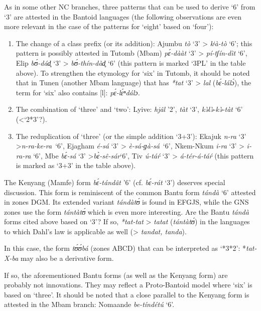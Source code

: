 \newpage    
As in some other NC branches, three patterns that can be used to derive `6' from `3' are attested in the Bantoid languages (the following observations are even more relevant in the case of the patterns for `eight' based on `four'):

\begin{enumerate}
\item The change of a class prefix (or its addition): Ajumbu \textit{tò} ‘3’ > \textit{kʲà-tò} ‘6’; this pattern is possibly attested in Tutomb (Mbam) \textit{p{\'{ɛ}}-dààt} ‘3’ > \textit{pí-tʃín-dìt} ‘6’, Elip \textit{b{\'{ʊ}}-dád̥} ‘3’ > \textit{b{\'{ʊ}}-thín-dàd̥} ‘6’ (this pattern is marked ‘3PL’ in the table above). To strengthen the etymology for `six' in Tutomb, it should be noted that in Tunen (another Mbam language) that has \textit{*tat} ‘3’ > \textit{lal} (\textit{b{\'{ɛ}}-lál{\'{ɔ}}}), the term for `six' also contains [l]: \textit{p{\'{ɛ}}-l{\'{ɛ}}ⁿdálɔ.}
  
\item The combination of `three' and `two': Lyive: \textit{hjâl} ’2’, \textit{tàt} ‘3’, \textit{k{\`{ə}}l{\`{ə}}-k{\`{ə}}-tàt} ‘6’ (<‘2*3’?).
\item The reduplication of `three' (or the simple addition ‘3+3’): Ekajuk \textit{n-ra} ‘3’ >\textit{n-ra-ke-ra}~‘6’, Ejagham \textit{é-sá} ‘3’ > \textit{è-sá-ɡà-sá}~‘6’, Nkem-Nkum \textit{i-ra} ‘3’ > \textit{i-ra-ra} ‘6’, Mbe \textit{b{\'{ɛ}}-sá} ‘3’ >\textit{b{\`{ɛ}}-sê-sár}‘6’, Tiv \textit{ú-tá{\'{r}}} ‘3’ > \textit{á-tér-á-tá{\'{r}}} (this pattern is marked as ‘3+3’ in the table above). 
\end{enumerate}
The Kenyang (Mamfe) form \textit{b{\'{ɛ}}-tándât} ’6’ (cf. \textit{b{\'{ɛ}}-rát} ‘3’) deserves special discussion. This form is reminiscent of the common Bantu form \textit{tándà} ‘6’ attested in zones DGM. Its extended variant \textit{tándàt{\'{ʊ}}} is found in EFGJS, while the GNS zones use the form \textit{tántàt{\'{ʊ}}} which is even more interesting. Are the Bantu \textit{tándà} forms cited above based on `3'?  If so, \textit{*tat-tat} > \textit{tatat} (\textit{tántàt{\'{ʊ}}}) in the languages to which Dahl's law is applicable as well (> \textit{tandat, tanda}).

In this case, the form \textit{t{\'{ʊ}}{\'{ʊ}}bá} (zones ABCD) that can be interpreted as ‘*3*2’: *\textit{tat-X-ba} may also be a derivative form.  

If so, the aforementioned Bantu forms (as well as the Kenyang form) are probably not innovations. They may reflect a Proto-Bantoid model where `six' is based on `three'. It should be noted that a close parallel to the Kenyang form is attested in the Mbam branch: Nomaande \textit{be-tíndétú} ‘6’.

